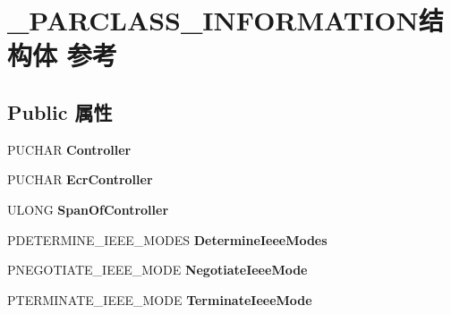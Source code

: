 \hypertarget{struct___p_a_r_c_l_a_s_s___i_n_f_o_r_m_a_t_i_o_n}{}\section{\+\_\+\+P\+A\+R\+C\+L\+A\+S\+S\+\_\+\+I\+N\+F\+O\+R\+M\+A\+T\+I\+O\+N结构体 参考}
\label{struct___p_a_r_c_l_a_s_s___i_n_f_o_r_m_a_t_i_o_n}
\subsection*{Public 属性}
\begin{DoxyCompactItemize}
\item 
\mbox{\label{struct___p_a_r_c_l_a_s_s___i_n_f_o_r_m_a_t_i_o_n_a5d15ffc7b5352db18debc6b19eb3ecc1}} 
P\+U\+C\+H\+AR {\bfseries Controller}
\item 
\mbox{\label{struct___p_a_r_c_l_a_s_s___i_n_f_o_r_m_a_t_i_o_n_aa33fae3957c3be9189ac73f1960c4255}} 
P\+U\+C\+H\+AR {\bfseries Ecr\+Controller}
\item 
\mbox{\label{struct___p_a_r_c_l_a_s_s___i_n_f_o_r_m_a_t_i_o_n_aab3f1b674ee6db88ba9b8e6c21cfa1c4}} 
U\+L\+O\+NG {\bfseries Span\+Of\+Controller}
\item 
\mbox{\label{struct___p_a_r_c_l_a_s_s___i_n_f_o_r_m_a_t_i_o_n_ae694ddbf3ac46cb08372a2340a87471a}} 
P\+D\+E\+T\+E\+R\+M\+I\+N\+E\+\_\+\+I\+E\+E\+E\+\_\+\+M\+O\+D\+ES {\bfseries Determine\+Ieee\+Modes}
\item 
\mbox{\label{struct___p_a_r_c_l_a_s_s___i_n_f_o_r_m_a_t_i_o_n_ad2355ab8416d9de51542104a6bffa3a8}} 
P\+N\+E\+G\+O\+T\+I\+A\+T\+E\+\_\+\+I\+E\+E\+E\+\_\+\+M\+O\+DE {\bfseries Negotiate\+Ieee\+Mode}
\item 
\mbox{\label{struct___p_a_r_c_l_a_s_s___i_n_f_o_r_m_a_t_i_o_n_ae38dad11cdb015d71430e4ec9abc1898}} 
P\+T\+E\+R\+M\+I\+N\+A\+T\+E\+\_\+\+I\+E\+E\+E\+\_\+\+M\+O\+DE {\bfseries Terminate\+Ieee\+Mode}

\end{DoxyCompactItemize}
